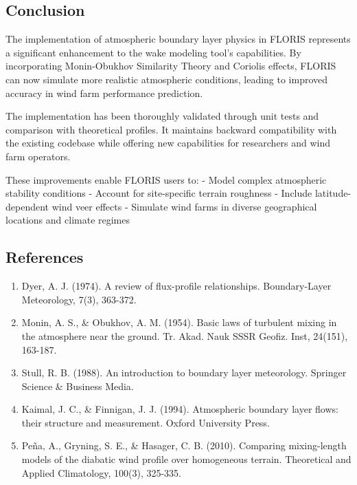 \documentclass[
]{article}
\providecommand{\tightlist}{%
  \setlength{\itemsep}{0pt}\setlength{\parskip}{0pt}}
\begin{document}
\hypertarget{conclusion}{%
\subsection{Conclusion}\label{conclusion}}

The implementation of atmospheric boundary layer physics in FLORIS
represents a significant enhancement to the wake modeling tool's
capabilities. By incorporating Monin-Obukhov Similarity Theory and
Coriolis effects, FLORIS can now simulate more realistic atmospheric
conditions, leading to improved accuracy in wind farm performance
prediction.

The implementation has been thoroughly validated through unit tests and
comparison with theoretical profiles. It maintains backward
compatibility with the existing codebase while offering new capabilities
for researchers and wind farm operators.

These improvements enable FLORIS users to: - Model complex atmospheric
stability conditions - Account for site-specific terrain roughness -
Include latitude-dependent wind veer effects - Simulate wind farms in
diverse geographical locations and climate regimes

\hypertarget{references}{%
\subsection{References}\label{references}}

\begin{enumerate}
\def\labelenumi{\arabic{enumi}.}
\tightlist
\item
  Dyer, A. J. (1974). A review of flux-profile relationships.
  Boundary-Layer Meteorology, 7(3), 363-372.
\item
  Monin, A. S., \& Obukhov, A. M. (1954). Basic laws of turbulent mixing
  in the atmosphere near the ground. Tr. Akad. Nauk SSSR Geofiz. Inst,
  24(151), 163-187.
\item
  Stull, R. B. (1988). An introduction to boundary layer meteorology.
  Springer Science \& Business Media.
\item
  Kaimal, J. C., \& Finnigan, J. J. (1994). Atmospheric boundary layer
  flows: their structure and measurement. Oxford University Press.
\item
  Peña, A., Gryning, S. E., \& Hasager, C. B. (2010). Comparing
  mixing-length models of the diabatic wind profile over homogeneous
  terrain. Theoretical and Applied Climatology, 100(3), 325-335.
\end{enumerate}
\end{document}
